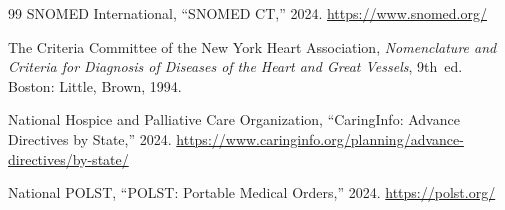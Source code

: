 \documentclass[11pt]{article}
\begin{document}
\begin{thebibliography}{99}
SNOMED International,
``SNOMED CT,'' 2024.
\url{https://www.snomed.org/}

The Criteria Committee of the New York Heart Association,
\textit{Nomenclature and Criteria for Diagnosis of Diseases of the Heart and Great Vessels}, 9th~ed.
Boston: Little, Brown, 1994.

National Hospice and Palliative Care Organization,
``CaringInfo: Advance Directives by State,'' 2024.
\url{https://www.caringinfo.org/planning/advance-directives/by-state/}

National POLST,
``POLST: Portable Medical Orders,'' 2024.
\url{https://polst.org/}

\end{thebibliography}
\end{document}
